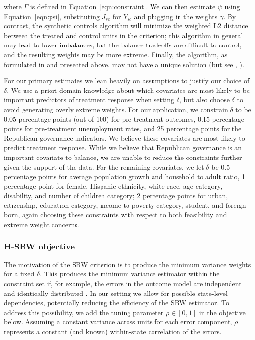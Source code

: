 \documentclass[article]{imsart}
\theoremstyle{plain}
\theoremstyle{remark}
\begin{document}
where $\Gamma$ is defined in Equation~\ref{eqn:constraint}. We can then estimate $\psi$ using Equation~\ref{eqn:psi}, substituting $J_{sc}$ for $Y_{sc}$ and plugging in the weights $\gamma$. By contrast, the synthetic controls algorithm will minimize the weighted L2 distance between the treated and control units in the criterion; this algorithm in general may lead to lower imbalances, but the balance tradeoffs are difficult to control, and the resulting weights may be more extreme. Finally, the algorithm, as formulated in \cite{abadie2010synthetic} and presented above, may not have a unique solution (but see \cite{ben2018augmented}, \cite{becker2017cross}).

For our primary estimates we lean heavily on assumptions to justify our choice of $\delta$. We use a priori domain knowledge about which covariates are most likely to be important predictors of treatment response when setting $\delta$, but also choose $\delta$ to avoid generating overly extreme weights. For our application, we constrain $\delta$ to be 0.05 percentage points (out of 100) for pre-treatment outcomes, 0.15 percentage points for pre-treatment unemployment rates, and 25 percentage points for the Republican governance indicators. We believe these covariates are most likely to predict treatment response. While we believe that Republican governance is an important covariate to balance, we are unable to reduce the constraints further given the support of the data. For the remaining covariates, we let $\delta$ be 0.5 percentage points for average population growth and household to adult ratio, 1 percentage point for female, Hispanic ethnicity, white race, age category, disability, and number of children category; 2 percentage points for urban, citizenship, education category, income-to-poverty category, student, and foreign-born, again choosing these constraints with respect to both feasibility and extreme weight concerns. 

\subsubsection{H-SBW objective}

The motivation of the SBW criterion is to produce the minimum variance weights for a fixed $\delta$. This produces the minimum variance estimator within the constraint set if, for example, the errors in the outcome model are independent and identically distributed \cite{zubizarreta2015stable}. In our setting we allow for possible state-level dependencies, potentially reducing the efficiency of the SBW estimator. To address this possibility, we add the tuning parameter $\rho \in [0, 1]$ in the objective below. Assuming a constant variance across units for each error component, $\rho$ represents a constant (and known) within-state correlation of the errors. 
\end{document}
